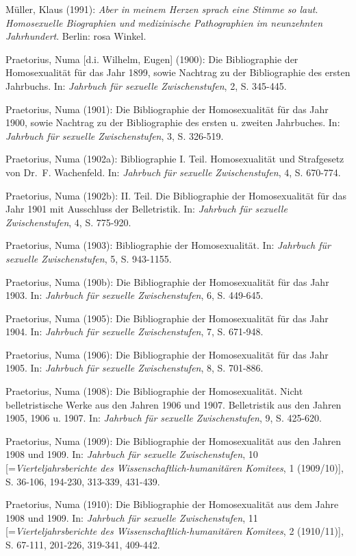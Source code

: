 \documentclass[a4paper,
fontsize=11pt,
oneside,
numbers=noperiodatend,
parskip=half-,
bibliography=totoc,
final
]{scrartcl}
\begin{document}
Müller, Klaus (1991): \emph{Aber in meinem Herzen sprach eine Stimme so
laut}. \emph{Homosexuelle Biographien und medizinische Pathographien im
neunzehnten Jahrhundert}. Berlin: rosa Winkel.

Praetorius, Numa {[}d.i. Wilhelm, Eugen{]} (1900): Die Bibliographie der
Homosexualität für das Jahr 1899, sowie Nachtrag zu der Bibliographie
des ersten Jahrbuchs. In: \emph{Jahrbuch für sexuelle Zwischenstufen},
2, S. 345-445.

Praetorius, Numa (1901): Die Bibliographie der Homosexualität für das
Jahr 1900, sowie Nachtrag zu der Bibliographie des ersten u. zweiten
Jahrbuches. In: \emph{Jahrbuch für sexuelle Zwischenstufen}, 3, S.
326-519.

Praetorius, Numa (1902a): Bibliographie I. Teil. Homosexualität und
Strafgesetz von Dr.~F. Wachenfeld. In: \emph{Jahrbuch für sexuelle
Zwischenstufen}, 4, S. 670-774.

Praetorius, Numa (1902b): II. Teil. Die Bibliographie der Homosexualität
für das Jahr 1901 mit Ausschluss der Belletristik. In: \emph{Jahrbuch
für sexuelle Zwischenstufen}, 4, S. 775-920.

Praetorius, Numa (1903): Bibliographie der Homosexualität. In:
\emph{Jahrbuch für sexuelle Zwischenstufen}, 5, S. 943-1155.

Praetorius, Numa (190b): Die Bibliographie der Homosexualität für das
Jahr 1903. In: \emph{Jahrbuch für sexuelle Zwischenstufen}, 6, S.
449-645.

Praetorius, Numa (1905): Die Bibliographie der Homosexualität für das
Jahr 1904. In: \emph{Jahrbuch für sexuelle Zwischenstufen}, 7, S.
671-948.

Praetorius, Numa (1906): Die Bibliographie der Homosexualität für das
Jahr 1905. In: \emph{Jahrbuch für sexuelle Zwischenstufen}, 8, S.
701-886.

Praetorius, Numa (1908): Die Bibliographie der Homosexualität. Nicht
belletristische Werke aus den Jahren 1906 und 1907. Belletristik aus den
Jahren 1905, 1906 u. 1907. In: \emph{Jahrbuch für sexuelle
Zwischenstufen}, 9, S. 425-620.

Praetorius, Numa (1909): Die Bibliographie der Homosexualität aus den
Jahren 1908 und 1909. In: \emph{Jahrbuch für sexuelle Zwischenstufen},
10 {[}=\emph{Vierteljahrsberichte des Wissenschaftlich-humanitären
Komitees}, 1 (1909/10){]}, S. 36-106, 194-230, 313-339, 431-439.

Praetorius, Numa (1910): Die Bibliographie der Homosexualität aus dem
Jahre 1908 und 1909. In: \emph{Jahrbuch für sexuelle Zwischenstufen}, 11
{[}=\emph{Vierteljahrsberichte des Wissenschaftlich-humanitären
Komitees}, 2 (1910/11){]}, S. 67-111, 201-226, 319-341, 409-442.
\end{document}
